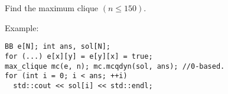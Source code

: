 Find the maximum clique $(n\le 150)$.

Example:
\begin{verbatim}
BB e[N]; int ans, sol[N];
for (...) e[x][y] = e[y][x] = true;
max_clique mc(e, n); mc.mcqdyn(sol, ans); //0-based.
for (int i = 0; i < ans; ++i)
  std::cout << sol[i] << std::endl;
\end{verbatim}

\inputminted{cpp}{src/graph/clique/dn-maximum-clique.cpp.com}
